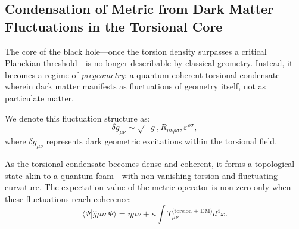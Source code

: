 \documentclass{article}
\begin{document}
\medskip
\begin{center}
\end{center}
\medskip



\subsection{Condensation of Metric from Dark Matter Fluctuations in the Torsional Core} The core of the black hole---once the torsion density surpasses a critical Planckian threshold---is no longer describable by classical geometry. Instead, it becomes a regime of \textit{pregeometry}: a quantum-coherent torsional condensate wherein dark matter manifests as fluctuations of geometry itself, not as particulate matter.

We denote this fluctuation structure as: \begin{equation} \delta g_{\mu\nu} \sim \sqrt{-g} , R_{\mu\nu\rho\sigma} , \varepsilon^{\rho\sigma}, \end{equation} where $\delta g_{\mu\nu}$ represents dark geometric excitations within the torsional field.

As the torsional condensate becomes dense and coherent, it forms a topological state akin to a quantum foam---with non-vanishing torsion and fluctuating curvature. The expectation value of the metric operator is non-zero only when these fluctuations reach coherence: \begin{equation} \langle \Psi | \hat{g}{\mu\nu} | \Psi \rangle = \eta{\mu\nu} + \kappa \int T_{\mu\nu}^{\text{(torsion + DM)}} d^4x. \end{equation}
\end{document}

